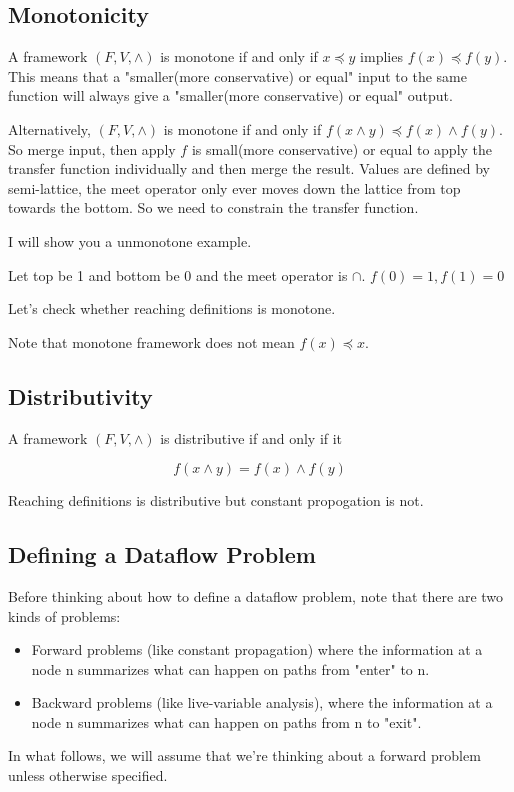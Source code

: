 \subsection{Monotonicity}


A framework \((F,V,\wedge)\) is monotone if and only if \(x \preceq y \) implies \(f(x) \preceq f(y)\). This means that
a "smaller(more conservative) or equal" input to the same function will always give a "smaller(more conservative)  or equal" output.



Alternatively, \((F,V,\wedge)\) is monotone if and only if \(  f(x \wedge y) \preceq f(x) \wedge f(y)\). So  merge input, then apply \(f\) is small(more conservative)  or equal to apply the transfer
function individually and then merge the result. Values are defined by semi-lattice, the meet operator only ever moves down the lattice from top towards the bottom.
So we need to constrain the transfer function.

I will show you a unmonotone example.

Let top be 1 and bottom be 0 and the meet operator is \(\cap\). \(f(0) = 1, f(1) = 0\)


Let's check whether reaching definitions is monotone.


Note that monotone framework does not mean \(f(x) \preceq  x\).



\subsection{Distributivity}

A framework \((F,V,\wedge)\) is distributive if and only if it

\[
	f(x \wedge y) = f(x) \wedge f(y)
\]



Reaching definitions is distributive but constant propogation is not.




\subsection{Defining a Dataflow Problem}


Before thinking about how to define a dataflow problem, note that there are two kinds of problems:
\begin{itemize}
	\item Forward problems (like constant propagation) where the information at a node n summarizes what can happen on paths from "enter" to n.
	\item Backward problems (like live-variable analysis), where the information at a node n summarizes what can happen on paths from n to "exit".


\end{itemize}
In what follows, we will assume that we're thinking about a forward problem unless otherwise specified.

